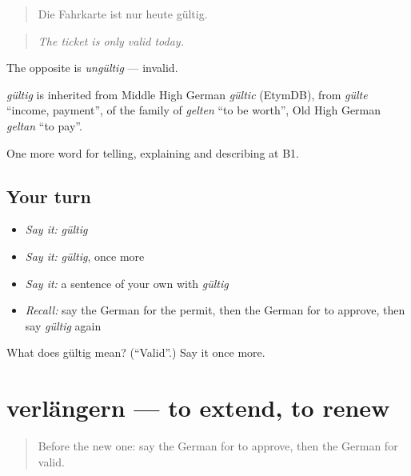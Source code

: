 \begin{quote}
Die Fahrkarte ist nur heute gültig.
\end{quote}

\begin{quote}
\emph{The ticket is only valid today.}
\end{quote}

The opposite is \emph{ungültig} — invalid.

\begin{cousinweb}
\emph{gültig} is inherited from Middle High German \emph{gültic} (EtymDB), from \emph{gülte} \textquotedblleft{}income, payment\textquotedblright{}, of the family of \emph{gelten} \textquotedblleft{}to be worth\textquotedblright{}, Old High German \emph{geltan} \textquotedblleft{}to pay\textquotedblright{}.
\end{cousinweb}

\begin{grammarlens}[title={What you've built}]
One more word for telling, explaining and describing at B1.
\end{grammarlens}

\subsection*{Your turn}
\begin{itemize}
\raggedright
  \item \emph{Say it:} \emph{gültig}
  \item \emph{Say it:} \emph{gültig}, once more
  \item \emph{Say it:} a sentence of your own with \emph{gültig}
  \item \emph{Recall:} say the German for the permit, then the German for to approve, then say \emph{gültig} again
\end{itemize}

\begin{tcolorbox}[breakable,colback=teal!4,colframe=teal!35!black,title={Before you move on}]
What does gültig mean? (\textquotedblleft{}Valid\textquotedblright{}.) Say it once more.
\end{tcolorbox}
\section[verlängern]{verlängern — to extend, to renew}

\label{lesson:GE-C384-verlaengern}



\begin{quote}
Before the new one: say the German for to approve, then the German for valid.
\end{quote}

